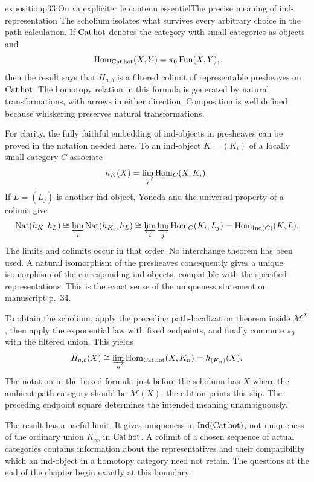 \begin{dcomment}{exposition}{p33:On va expliciter le contenu essentiel}{The precise meaning of ind-representation}
The scholium isolates what survives every arbitrary choice in the path calculation. If $\mathrm{Cat\,hot}$ denotes the category with small categories as objects and
\[
 \operatorname{Hom}_{\mathrm{Cat\,hot}}(X,Y)
       =\pi_0\operatorname{Fun}(X,Y),
\]
then the result says that $H_{a,b}$ is a filtered colimit of representable presheaves on $\mathrm{Cat\,hot}$. The homotopy relation in this formula is generated by natural transformations, with arrows in either direction. Composition is well defined because whiskering preserves natural transformations.

For clarity, the fully faithful embedding of ind-objects in presheaves can be proved in the notation needed here. To an ind-object $K=(K_i)$ of a locally small category $C$ associate
\[
 h_K(X)=\varinjlim_i\operatorname{Hom}_C(X,K_i).
\]
If $L=(L_j)$ is another ind-object, Yoneda and the universal property of a colimit give
\[
 \operatorname{Nat}(h_K,h_L)
 \cong\varprojlim_i\operatorname{Nat}(h_{K_i},h_L)
 \cong\varprojlim_i\varinjlim_j\operatorname{Hom}_C(K_i,L_j)
 =\operatorname{Hom}_{\operatorname{Ind}(C)}(K,L).
\]
The limits and colimits occur in that order. No interchange theorem has been used. A natural isomorphism of the presheaves consequently gives a unique isomorphism of the corresponding ind-objects, compatible with the specified representations. This is the exact sense of the uniqueness statement on manuscript p.~34.

To obtain the scholium, apply the preceding path-localization theorem inside $\mathcal M^X$, then apply the exponential law with fixed endpoints, and finally commute $\pi_0$ with the filtered union. This yields
\[
 H_{a,b}(X)
  \cong\varinjlim_n\operatorname{Hom}_{\mathrm{Cat\,hot}}(X,K_n)
  =h_{(K_n)}(X).
\]
The notation in the boxed formula just before the scholium has $X$ where the ambient path category should be $\mathcal M(X)$; the edition prints this slip. The preceding endpoint square determines the intended meaning unambiguously.

The result has a useful limit. It gives uniqueness in $\operatorname{Ind}(\mathrm{Cat\,hot})$, not uniqueness of the ordinary union $K_\infty$ in $\mathrm{Cat\,hot}$. A colimit of a chosen sequence of actual categories contains information about the representatives and their compatibility which an ind-object in a homotopy category need not retain. The questions at the end of the chapter begin exactly at this boundary.
\end{dcomment}


